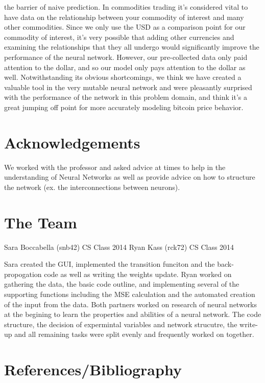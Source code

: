 \documentclass[a4paper,11pt]{article}
\begin{document}
the barrier of naive prediction.
\newline \newline
In commodities trading it's considered vital to have data on the relationship between your commodity of interest and many other
commodities.  Since we only use the USD as a comparison point for our commodity of interest, it's very possible that adding other
currencies and examining the relationships that they all undergo would significantly improve the performance of the neural 
network.  However, our pre-collected data only paid attention to the dollar, and so our model only pays attention to the dollar
as well.  Notwithstanding its obvious shortcomings, we think we have created a valuable tool in the very mutable neural network and
were pleasantly surprised with the performance of the network in this problem domain, and think it's a great jumping off
point for more accurately modeling bitcoin price behavior.


\section{Acknowledgements}

We worked with the professor and asked advice at times to help in the understanding of Neural Networks as well as provide advice on how to structure the network (ex. the interconnections between neurons). 

\section{The Team}
Sara Boccabella (snb42) CS Class 2014
Ryan Kass (rck72) CS Class 2014

Sara created the GUI, implemented the transition funciton and the back-propogation code as well as writing the weights update. 
Ryan worked on gathering the data, the basic code outline, and implementing several of the supporting functions including the MSE calculation and the automated creation of the input from the data.
Both partners worked on research of neural networks at the begining to learn the properties and abilities of a neural network. The code structure, the decision of expermintal variables and network strucutre, the write-up and all remaining tasks were split evenly and frequently worked on together. 


\newpage
\section{References/Bibliography}
\end{document}
